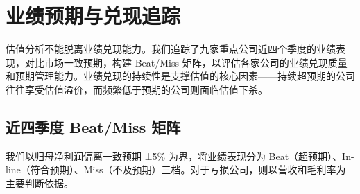 \section{业绩预期与兑现追踪}

估值分析不能脱离业绩兑现能力。我们追踪了九家重点公司近四个季度的业绩表现，对比市场一致预期，构建 Beat/Miss 矩阵，以评估各家公司的业绩兑现质量和预期管理能力。业绩兑现的持续性是支撑估值的核心因素——持续超预期的公司往往享受估值溢价，而频繁低于预期的公司则面临估值下杀。

\subsection{近四季度 Beat/Miss 矩阵}

我们以归母净利润偏离一致预期 ±5\% 为界，将业绩表现分为 Beat（超预期）、In-line（符合预期）、Miss（不及预期）三档。对于亏损公司，则以营收和毛利率为主要判断依据。

